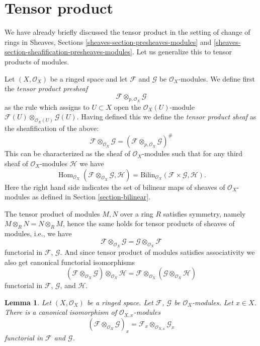 \documentclass{stacks-project}
\theoremstyle{plain}
\newtheorem{lemma}[subsection]{Lemma}
\theoremstyle{definition}
\theoremstyle{remark}
\numberwithin{equation}{subsection}
\def\Hom{\mathop{\mathrm{Hom}}\nolimits}
\begin{document}
\section{Tensor product}
\label{section-tensor-product}

\noindent
We have already briefly discussed the tensor product in the setting
of change of rings in Sheaves, Sections
\ref{sheaves-section-presheaves-modules} and
\ref{sheaves-section-sheafification-presheaves-modules}.
Let us generalize this to tensor products of modules.

\medskip\noindent
Let $(X, \mathcal{O}_X)$ be a ringed space and let
$\mathcal{F}$ and $\mathcal{G}$ be $\mathcal{O}_X$-modules.
We define first the {\it tensor product presheaf}
$$
\mathcal{F} \otimes_{p, \mathcal{O}_X} \mathcal{G}
$$
as the rule which assigns to $U \subset X$ open the
$\mathcal{O}_X(U)$-module
$\mathcal{F}(U) \otimes_{\mathcal{O}_X(U)} \mathcal{G}(U)$.
Having defined this we define the {\it tensor product sheaf}
as the sheafification of the above:
$$
\mathcal{F} \otimes_{\mathcal{O}_X} \mathcal{G}
=
(\mathcal{F} \otimes_{p, \mathcal{O}_X} \mathcal{G})^\#
$$
This can be characterized as the sheaf of
$\mathcal{O}_X$-modules such that for any third
sheaf of $\mathcal{O}_X$-modules $\mathcal{H}$
we have
$$
\Hom_{\mathcal{O}_X}
(\mathcal{F} \otimes_{\mathcal{O}_X} \mathcal{G}, \mathcal{H})
=
\text{Bilin}_{\mathcal{O}_X}(\mathcal{F} \times \mathcal{G}, \mathcal{H}).
$$
Here the right hand side indicates the set of bilinear maps of sheaves
of $\mathcal{O}_X$-modules as defined in Section \ref{section-bilinear}.

\medskip\noindent
The tensor product of modules $M, N$ over a ring $R$ satisfies symmetry,
namely $M \otimes_R N = N \otimes_R M$, hence the same holds for
tensor products of sheaves of modules, i.e., we have
$$
\mathcal{F} \otimes_{\mathcal{O}_X} \mathcal{G}
=
\mathcal{G} \otimes_{\mathcal{O}_X} \mathcal{F}
$$
functorial in $\mathcal{F}$, $\mathcal{G}$.
And since tensor product of modules satisfies associativity we
also get canonical functorial isomorphisms
$$
(\mathcal{F} \otimes_{\mathcal{O}_X} \mathcal{G})
\otimes_{\mathcal{O}_X} \mathcal{H}
=
\mathcal{F} \otimes_{\mathcal{O}_X}
(\mathcal{G} \otimes_{\mathcal{O}_X} \mathcal{H})
$$
functorial in $\mathcal{F}$, $\mathcal{G}$, and $\mathcal{H}$.

\begin{lemma}
\label{lemma-stalk-tensor-product}
Let $(X, \mathcal{O}_X)$ be a ringed space.
Let $\mathcal{F}$, $\mathcal{G}$ be $\mathcal{O}_X$-modules.
Let $x \in X$. There is a canonical isomorphism
of $\mathcal{O}_{X, x}$-modules
$$
(\mathcal{F} \otimes_{\mathcal{O}_X} \mathcal{G})_x
=
\mathcal{F}_x \otimes_{\mathcal{O}_{X, x}} \mathcal{G}_x
$$
functorial in $\mathcal{F}$ and $\mathcal{G}$.
\end{lemma}
\end{document}
